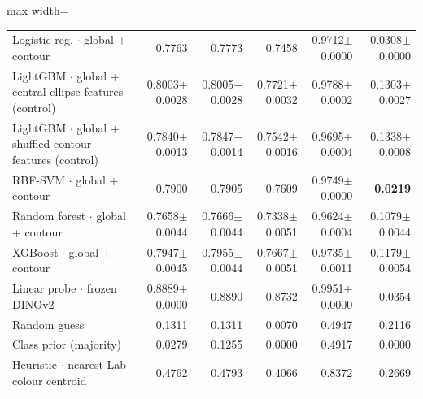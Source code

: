 \begin{table}[t]
\begin{adjustbox}{max width=\linewidth}
\begin{tabular}{lrrrrr}
Logistic reg. $\cdot$ global + contour & 0.7763 & 0.7773 & 0.7458 & 0.9712{\scriptsize$\pm$0.0000} & 0.0308{\scriptsize$\pm$0.0000} \\
LightGBM $\cdot$ global + central-ellipse features (control) & 0.8003{\scriptsize$\pm$0.0028} & 0.8005{\scriptsize$\pm$0.0028} & 0.7721{\scriptsize$\pm$0.0032} & 0.9788{\scriptsize$\pm$0.0002} & 0.1303{\scriptsize$\pm$0.0027} \\
LightGBM $\cdot$ global + shuffled-contour features (control) & 0.7840{\scriptsize$\pm$0.0013} & 0.7847{\scriptsize$\pm$0.0014} & 0.7542{\scriptsize$\pm$0.0016} & 0.9695{\scriptsize$\pm$0.0004} & 0.1338{\scriptsize$\pm$0.0008} \\
RBF-SVM $\cdot$ global + contour & 0.7900 & 0.7905 & 0.7609 & 0.9749{\scriptsize$\pm$0.0000} & \textbf{0.0219} \\
Random forest $\cdot$ global + contour & 0.7658{\scriptsize$\pm$0.0044} & 0.7666{\scriptsize$\pm$0.0044} & 0.7338{\scriptsize$\pm$0.0051} & 0.9624{\scriptsize$\pm$0.0004} & 0.1079{\scriptsize$\pm$0.0044} \\
XGBoost $\cdot$ global + contour & 0.7947{\scriptsize$\pm$0.0045} & 0.7955{\scriptsize$\pm$0.0044} & 0.7667{\scriptsize$\pm$0.0051} & 0.9735{\scriptsize$\pm$0.0011} & 0.1179{\scriptsize$\pm$0.0054} \\
Linear probe $\cdot$ frozen DINOv2 & 0.8889{\scriptsize$\pm$0.0000} & 0.8890 & 0.8732 & 0.9951{\scriptsize$\pm$0.0000} & 0.0354 \\
Random guess & 0.1311 & 0.1311 & 0.0070 & 0.4947 & 0.2116 \\
Class prior (majority) & 0.0279 & 0.1255 & 0.0000 & 0.4917 & 0.0000 \\
Heuristic $\cdot$ nearest Lab-colour centroid & 0.4762 & 0.4793 & 0.4066 & 0.8372 & 0.2669 \\
\bottomrule
\end{tabular}\end{adjustbox}
\end{table}